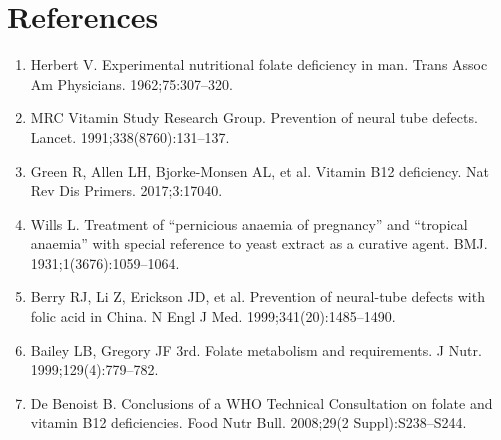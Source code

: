 \section*{References}
\begin{enumerate}
  \item Herbert V. Experimental nutritional folate deficiency in man. Trans Assoc Am Physicians. 1962;75:307--320.
  \item MRC Vitamin Study Research Group. Prevention of neural tube defects. Lancet. 1991;338(8760):131--137.
  \item Green R, Allen LH, Bjorke-Monsen AL, et al. Vitamin B12 deficiency. Nat Rev Dis Primers. 2017;3:17040.
  \item Wills L. Treatment of ``pernicious anaemia of pregnancy'' and ``tropical anaemia'' with special reference to yeast extract as a curative agent. BMJ. 1931;1(3676):1059--1064.
  \item Berry RJ, Li Z, Erickson JD, et al. Prevention of neural-tube defects with folic acid in China. N Engl J Med. 1999;341(20):1485--1490.
  \item Bailey LB, Gregory JF 3rd. Folate metabolism and requirements. J Nutr. 1999;129(4):779--782.
  \item De Benoist B. Conclusions of a WHO Technical Consultation on folate and vitamin B12 deficiencies. Food Nutr Bull. 2008;29(2 Suppl):S238--S244.
\end{enumerate}
\clearpage
